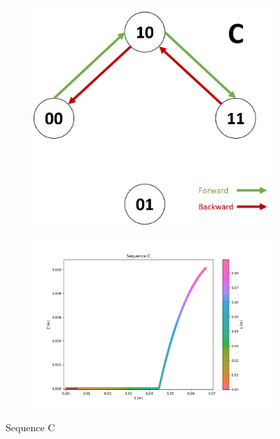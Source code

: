         \begin{figure}[h]
            \begin{subfigure}{.3\textwidth}
            \includegraphics[width=\textwidth]{images/S_C.png}
            \end{subfigure}%
            \begin{subfigure}{.7\textwidth}
            \includegraphics[width=\textwidth]{images/C.png}
            \end{subfigure}
            \caption{Sequence C}
        \end{figure}
